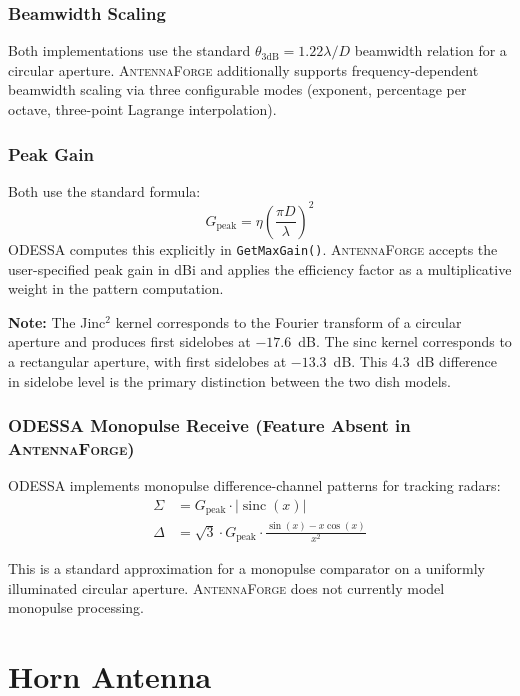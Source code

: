 \documentclass[11pt,a4paper]{article}
\newcommand{\AF}{\textsc{AntennaForge}}
\newcommand{\OD}{\textsc{ODESSA}}
\newcommand{\sinc}{\operatorname{sinc}}
\newcommand{\caveat}[1]{\par\noindent\colorbox{highlightyellow}{\parbox{\dimexpr\linewidth-2\fboxsep\relax}{\textbf{Note:} #1}}\par\medskip}
\begin{document}
\subsubsection{Beamwidth Scaling}

Both implementations use the standard $\theta_{3\text{dB}} = 1.22\lambda/D$
beamwidth relation for a circular aperture.  \AF{} additionally supports
frequency-dependent beamwidth scaling via three configurable modes (exponent,
percentage per octave, three-point Lagrange interpolation).

\subsubsection{Peak Gain}

Both use the standard formula:
\[
  G_{\text{peak}} = \eta \left(\frac{\pi D}{\lambda}\right)^2
\]
\OD{} computes this explicitly in \texttt{GetMaxGain()}.  \AF{} accepts the
user-specified peak gain in dBi and applies the efficiency factor as a
multiplicative weight in the pattern computation.

\caveat{The Jinc$^2$ kernel corresponds to the Fourier transform of a
circular aperture and produces first sidelobes at $-17.6$~dB.  The sinc
kernel corresponds to a rectangular aperture, with first sidelobes at
$-13.3$~dB.  This 4.3~dB difference in sidelobe level is the primary
distinction between the two dish models.}

\subsubsection{\OD{} Monopulse Receive (Feature Absent in \AF{})}

\OD{} implements monopulse difference-channel patterns for tracking radars:
\begin{align}
  \Sigma &= G_{\text{peak}} \cdot |\sinc(x)| \\
  \Delta &= \sqrt{3} \cdot G_{\text{peak}} \cdot
    \frac{\sin(x) - x\cos(x)}{x^2}
\end{align}

This is a standard approximation for a monopulse comparator on a uniformly
illuminated circular aperture.  \AF{} does not currently model monopulse
processing.

\section{Horn Antenna}
\label{sec:horn}
\end{document}
